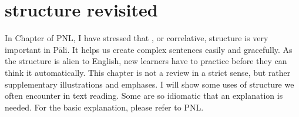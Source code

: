 \chapter{ structure revisited}\label{chap:yata}

In Chapter  of PNL, I have stressed that , or correlative, structure is very important in P\=ali. It helps us create complex sentences easily and gracefully. As the structure is alien to English, new learners have to practice before they can think it automatically. This chapter is not a review in a strict sense, but rather supplementary illustrations and emphases. I will show some uses of  structure we often encounter in text reading. Some are so idiomatic that an explanation is needed. For the basic explanation, please refer to PNL. 

\setcounter{parnum}{1}
